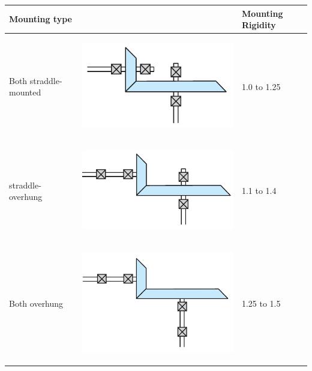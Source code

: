 \documentclass[a4paper,openany]{tufte-book}
\begin{document}
\begin{center}
\begin{tabular}{lll}
Mounting type &  & Mounting Rigidity\\
\hline
Both straddle-mounted & \begin{center}
\includegraphics[width=.9\linewidth]{pictures/Gears/both-straddle.png}
\end{center} & 1.0 to 1.25\\
straddle-overhung & \begin{center}
\includegraphics[width=.9\linewidth]{pictures/Gears/straddle-overhung.png}
\end{center} & 1.1 to 1.4\\
Both overhung & \begin{center}
\includegraphics[width=.9\linewidth]{pictures/Gears/both-overhung.png}
\end{center} & 1.25 to 1.5\\
\end{tabular}
\end{center}
\end{document}
